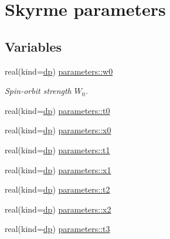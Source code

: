 \hypertarget{group__SKYRME__PARS}{}\section{Skyrme parameters}
\label{group__SKYRME__PARS}
\subsection*{Variables}
\begin{DoxyCompactItemize}
\item 
real(kind=\mbox{\hyperlink{namespaceparameters_a52f8c6351fd79345d8811e065bcbbb37}{dp}}) \mbox{\hyperlink{group__SKYRME__PARS_gabbfefb4415d1278f79fd07d05105335a}{parameters\+::w0}}
\begin{DoxyCompactList}\small\item\em Spin-\/orbit strength $W_0$. \end{DoxyCompactList}\item 
real(kind=\mbox{\hyperlink{namespaceparameters_a52f8c6351fd79345d8811e065bcbbb37}{dp}}) \mbox{\hyperlink{group__SKYRME__PARS_gadbebfa135603ae9f34b4a98ac62ce8d8}{parameters\+::t0}}
\item 
real(kind=\mbox{\hyperlink{namespaceparameters_a52f8c6351fd79345d8811e065bcbbb37}{dp}}) \mbox{\hyperlink{group__SKYRME__PARS_ga86c5690b49e0b02be9cae32459f6cc37}{parameters\+::x0}}
\item 
real(kind=\mbox{\hyperlink{namespaceparameters_a52f8c6351fd79345d8811e065bcbbb37}{dp}}) \mbox{\hyperlink{group__SKYRME__PARS_ga2104f8e3f4c55a866272683975f6acd0}{parameters\+::t1}}
\item 
real(kind=\mbox{\hyperlink{namespaceparameters_a52f8c6351fd79345d8811e065bcbbb37}{dp}}) \mbox{\hyperlink{group__SKYRME__PARS_ga17d86815551fd59fbeaba6cc8e54438b}{parameters\+::x1}}
\item 
real(kind=\mbox{\hyperlink{namespaceparameters_a52f8c6351fd79345d8811e065bcbbb37}{dp}}) \mbox{\hyperlink{group__SKYRME__PARS_ga28e545481d284c866487bfb61e918159}{parameters\+::t2}}
\item 
real(kind=\mbox{\hyperlink{namespaceparameters_a52f8c6351fd79345d8811e065bcbbb37}{dp}}) \mbox{\hyperlink{group__SKYRME__PARS_ga505cd8d8fea1c311291e29cfb0516c91}{parameters\+::x2}}
\item 
real(kind=\mbox{\hyperlink{namespaceparameters_a52f8c6351fd79345d8811e065bcbbb37}{dp}}) \mbox{\hyperlink{group__SKYRME__PARS_ga41ad159facccbc41a3a4bf58942da03d}{parameters\+::t3}}
\item 

\end{DoxyCompactItemize}
